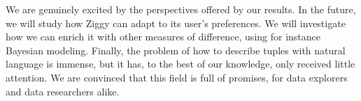 We are genuinely excited by the perspectives offered by our results. In the
future, we will study how Ziggy can adapt to its user's preferences. We will
investigate how we can enrich it with other measures of difference, using for
instance Bayesian modeling. Finally, the problem of how to describe tuples with
natural language is immense, but it has, to the best of our knowledge, only
received little attention. We are convinced that this field is full of promises, for
data explorers and data researchers alike.


%
%



